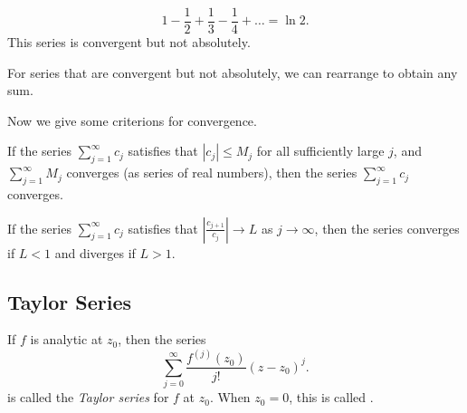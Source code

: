 \begin{example}
	 \[
		1 - \frac{1}{2} + \frac{1}{3} - \frac{1}{4} + \ldots = \ln 2
	.\] 
	This series is convergent but not absolutely.

	For series that are convergent but not absolutely, we can rearrange to obtain any sum.
\end{example}

Now we give some criterions for convergence.
\begin{theorem}
	If the series $\sum_{j=1}^{\infty} c_j$ satisfies that $|c_j| \le  M_j$ for all sufficiently large $j$, and $\sum_{j=1}^{\infty} M_j$ converges (as series of real numbers), then the series $\sum_{j=1}^{\infty} c_j$converges.
\end{theorem}

\begin{theorem}
	If the series $\sum_{j=1}^{\infty} c_j$ satisfies that $|\frac{c_{j+1}}{c_j}|  \to L$ as $j \to \infty $, then the series converges if $L < 1$ and diverges if $L > 1$.
\end{theorem}

\subsection{Taylor Series}
\begin{definition}
	If $f$ is analytic at $z_0$, then the series
	\[
		\sum_{j=0}^{\infty} \frac{f^{(j)}(z_0)}{j!}(z-z_0)^j
	.\] 
	is called the \textit{Taylor series} for $f$ at $z_0$. When $z_0 = 0$, this is called .
\end{definition}

